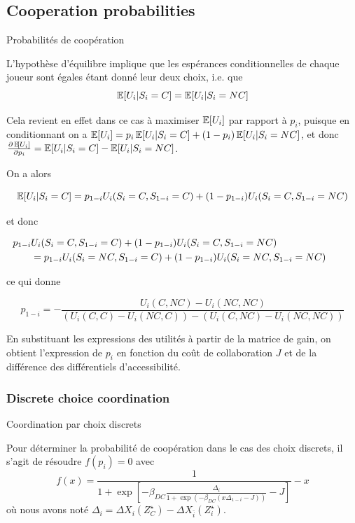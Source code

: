 \subsection{Cooperation probabilities}{Probabilités de coopération}


L'hypothèse d'équilibre implique que les espérances conditionnelles de chaque joueur sont égales étant donné leur deux choix, i.e. que 
\[
\operatorname{\mathbb{E}}\!\left[U_i|S_i=C\right] = \operatorname{\mathbb{E}}\!\left[U_i|S_i=NC\right]
\] 

Cela revient en effet dans ce cas à maximiser $\operatorname{\mathbb{E}}\!\left[U_i\right]$ par rapport à $p_i$, puisque en conditionnant on a $\operatorname{\mathbb{E}}\!\left[U_i\right] = p_i \operatorname{\mathbb{E}}\!\left[U_i|S_i = C\right] + (1 - p_i) \operatorname{\mathbb{E}}\!\left[U_i|S_i = NC\right]$, et donc $\frac{\partial \operatorname{\mathbb{E}}\!\left[U_i\right]}{\partial p_i} = \operatorname{\mathbb{E}}\!\left[U_i|S_i = C\right] - \operatorname{\mathbb{E}}\!\left[U_i| S_i = NC\right]$.

On a alors

\[
\operatorname{\mathbb{E}}\!\left[U_i|S_i=C\right] = p_{1-i} U_i(S_i=C,S_{1-i}=C) + (1- p_{1-i}) U_i (S_i=C,S_{1-i}=NC)
\]

et donc 

\begin{equation*}
\hspace{-1cm}
\begin{split}
	p_{1-i} & U_i(S_i=C,S_{1-i}=C) + (1- p_{1-i}) U_i (S_i=C,S_{1-i}=NC) \\
	& = p_{1-i} U_i(S_i=NC,S_{1-i}=C) + (1- p_{1-i}) U_i (S_i=NC,S_{1-i}=NC)
\end{split}
\end{equation*}

ce qui donne

\[
p_{1-i} = - \frac{U_i(C,NC) - U_i(NC,NC)}{\left(U_i(C,C) - U_i(NC,C)\right) - \left(U_i(C,NC) - U_i(NC,NC)\right)}
\]

En substituant les expressions des utilités à partir de la matrice de gain, on obtient l'expression de $p_i$ en fonction du coût de collaboration $J$ et de la différence des différentiels d'accessibilité.


\subsubsection{Discrete choice coordination}{Coordination par choix discrets}


Pour déterminer la probabilité de coopération dans le cas des choix discrets, il s'agit de résoudre $f(p_i) = 0$ avec
\[
f(x) = \frac{1}{1+\exp\left[-\beta_{DC}\frac{\Delta_i}{1 + \exp(-\beta_{DC}(x \Delta_{1-i} - J))} - J\right]} - x
\]
où nous avons noté $\Delta_i = \Delta X_{i}(Z^{\star}_{C}) - \Delta X_{\bar{i}}(Z^{\star}_{i})$.


